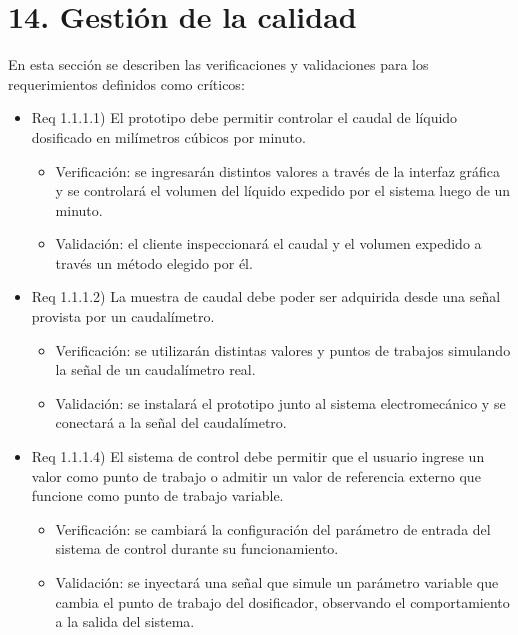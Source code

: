\documentclass[
11pt, %
]{charter}
\begin{document}
\section{14. Gestión de la calidad}
\label{sec:calidad}

En esta sección se describen las verificaciones y validaciones para los requerimientos definidos como críticos:

\begin{itemize} 
\item Req 1.1.1.1) El prototipo debe permitir controlar el caudal de líquido dosificado en milímetros cúbicos por minuto.

\begin{itemize}
	\item Verificación: se ingresarán distintos valores a través de la interfaz gráfica y se controlará el volumen del líquido expedido por el sistema luego de un minuto.
	\item Validación: el cliente inspeccionará el caudal y el volumen expedido a través un método elegido por él.
\end{itemize}

\item Req 1.1.1.2) La muestra de caudal debe poder ser adquirida desde una señal provista por un caudalímetro.

\begin{itemize}
	\item Verificación: se utilizarán distintas valores y puntos de trabajos simulando la señal de un caudalímetro real.
	\item Validación: se instalará el prototipo junto al sistema electromecánico y se conectará a la señal del caudalímetro.
\end{itemize}

\item Req 1.1.1.4) El sistema de control debe permitir que el usuario ingrese un valor como punto de trabajo o admitir un valor de referencia externo que funcione como punto de trabajo variable.

\begin{itemize}
	\item Verificación: se cambiará la configuración del parámetro de entrada del sistema de control durante su funcionamiento.
	\item Validación: se inyectará una señal que simule un parámetro variable que cambia el punto de trabajo del dosificador, observando el comportamiento a la salida del sistema.
\end{itemize}


\end{itemize}
\end{document}
